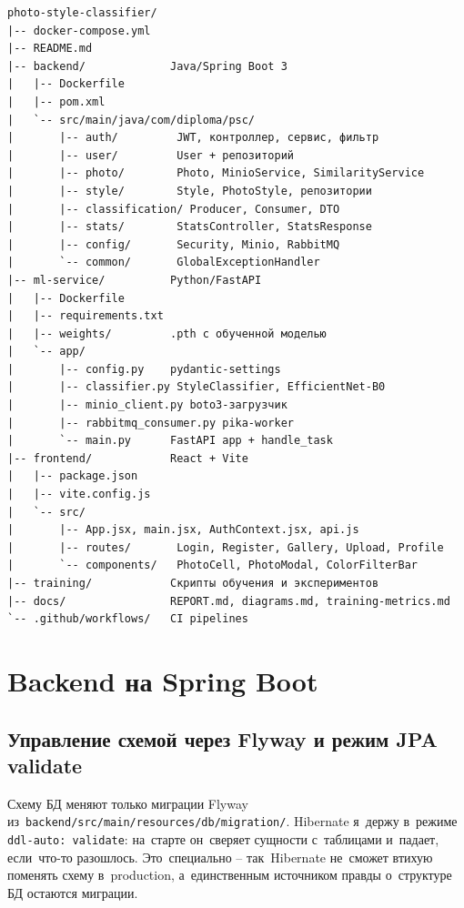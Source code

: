 \documentclass[a4paper,12pt]{diplom}
\begin{document}
\begin{lstlisting}[caption={Структура корневого каталога репозитория},label=lst:tree,basicstyle=\ttfamily\small,frame=single]
photo-style-classifier/
|-- docker-compose.yml
|-- README.md
|-- backend/             Java/Spring Boot 3
|   |-- Dockerfile
|   |-- pom.xml
|   `-- src/main/java/com/diploma/psc/
|       |-- auth/         JWT, контроллер, сервис, фильтр
|       |-- user/         User + репозиторий
|       |-- photo/        Photo, MinioService, SimilarityService
|       |-- style/        Style, PhotoStyle, репозитории
|       |-- classification/ Producer, Consumer, DTO
|       |-- stats/        StatsController, StatsResponse
|       |-- config/       Security, Minio, RabbitMQ
|       `-- common/       GlobalExceptionHandler
|-- ml-service/          Python/FastAPI
|   |-- Dockerfile
|   |-- requirements.txt
|   |-- weights/         .pth с обученной моделью
|   `-- app/
|       |-- config.py    pydantic-settings
|       |-- classifier.py StyleClassifier, EfficientNet-B0
|       |-- minio_client.py boto3-загрузчик
|       |-- rabbitmq_consumer.py pika-worker
|       `-- main.py      FastAPI app + handle_task
|-- frontend/            React + Vite
|   |-- package.json
|   |-- vite.config.js
|   `-- src/
|       |-- App.jsx, main.jsx, AuthContext.jsx, api.js
|       |-- routes/       Login, Register, Gallery, Upload, Profile
|       `-- components/   PhotoCell, PhotoModal, ColorFilterBar
|-- training/            Скрипты обучения и экспериментов
|-- docs/                REPORT.md, diagrams.md, training-metrics.md
`-- .github/workflows/   CI pipelines
\end{lstlisting}

\section{Backend на Spring Boot}
\label{sec:backend}

\subsection{Управление схемой через Flyway и режим JPA validate}

Схему БД меняют только миграции Flyway из~\verb|backend/src/main/resources/db/migration/|. Hibernate я~держу в~режиме \verb|ddl-auto: validate|: на~старте он~сверяет сущности с~таблицами и~падает, если~что-то разошлось. Это~специально -- так~Hibernate не~сможет втихую поменять схему в~production, а~единственным источником правды о~структуре БД остаются миграции.
\end{document}
